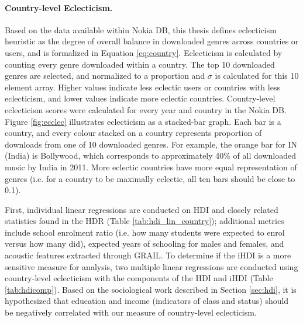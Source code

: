 \documentclass[a4paper]{article}
\begin{document}

\paragraph{Country-level Eclecticism.}
Based on the data available within Nokia DB, this thesis defines eclecticism heuristic as the degree of overall balance in downloaded genres across countries or users, and is formalized in Equation \ref{eq:country}. Eclecticism is calculated by counting every genre downloaded within a country. The top 10 downloaded genres are selected, and normalized to a proportion and $\sigma$ is calculated for this 10 element array. Higher values indicate less eclectic users or countries with less eclecticism, and lower values indicate more eclectic countries. Country-level eclecticism scores were calculated for every year and country in the Nokia DB. Figure \ref{fig:ecclec} illustrates eclecticism as a stacked-bar graph.  Each bar is a country, and every colour stacked on a country represents proportion of downloads from one of 10 downloaded genres. For example, the orange bar for IN (India) is Bollywood, which  corresponds to approximately 40\% of all downloaded music by India in 2011. More eclectic countries have more equal representation of genres (i.e. for a country to be maximally eclectic, all ten bars should be close to 0.1).

First, individual linear regressions are conducted on \Gls{HDI} and closely related statistics found in the HDR (Table \ref{tab:hdi_lin_country}); additional metrics include school enrolment ratio (i.e. how many students were expected to enrol versus how many did), expected years of schooling for males and females, and acoustic features extracted through \Gls{GRAIL}. To determine if the iHDI is a more sensitive measure for analysis, two multiple linear regressions are conducted using country-level eclecticism with the components of the \Gls{HDI} and \Gls{iHDI} (Table \ref{tab:hdicomp}). Based on the sociological work described in Section \ref{sec:hdi}, it is hypothesized that education and income (indicators of class and status) should be negatively correlated with our measure of country-level eclecticism. 
\end{document}
